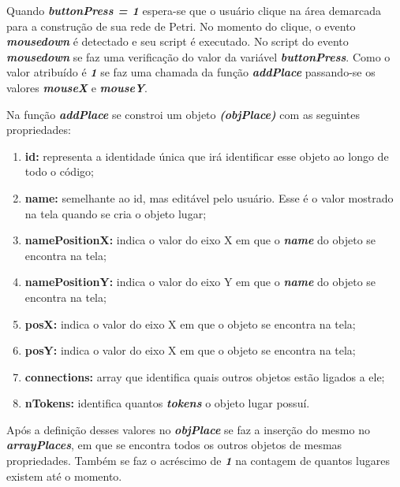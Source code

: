 \documentclass[
	12pt,				%
	openright,			%
	oneside,			%
	a4paper,			%
	english,			%
	brazil				%
	]{abntex2}
\begin{document}


Quando \textit{\textbf{buttonPress = 1}} espera-se que o usuário clique na área demarcada para a construção de sua rede de Petri. No momento do clique, o evento \textit{\textbf{mousedown}} é detectado e seu script é executado. No script do evento \textit{\textbf{mousedown}} se faz uma verificação do valor da variável \textit{\textbf{buttonPress}}. Como o valor atribuído é \textit{\textbf{1}} se faz uma chamada da função \textit{\textbf{addPlace}} passando-se os valores \textbf{\textit{mouseX}} e \textbf{\textit{mouseY}}. 



Na função \textbf{\textit{addPlace}} se constroi um objeto \textbf{\textit{(objPlace)}} com as seguintes propriedades: 

\begin{enumerate}
	\item \textbf{id:} representa a identidade única que irá identificar esse objeto ao longo de todo o código;
	\item \textbf{name:} semelhante ao id, mas editável pelo usuário. Esse é o valor mostrado na tela quando se cria o objeto lugar;
	\item \textbf{namePositionX:} indica o valor do eixo X em que o \textbf{\textit{name}} do objeto se encontra na tela;
	\item \textbf{namePositionY:} indica o valor do eixo Y em que o \textbf{\textit{name}} do objeto se encontra na tela;
	\item \textbf{posX:} indica o valor do eixo X em que o objeto se encontra na tela;
	\item \textbf{posY:} indica o valor do eixo X em que o objeto se encontra na tela;
	\item \textbf{connections:} array que identifica quais outros objetos estão ligados a ele;
	\item \textbf{nTokens:} identifica quantos \textbf{\textit{tokens}} o objeto lugar possuí.
\end{enumerate}

Após a definição desses valores no \textbf{\textit{objPlace}} se faz a inserção do mesmo no \textbf{\textit{arrayPlaces}}, em que se encontra todos os outros objetos de mesmas propriedades. Também se faz o acréscimo de \textbf{\textit{1}} na contagem de quantos lugares existem até o momento.
\end{document}
